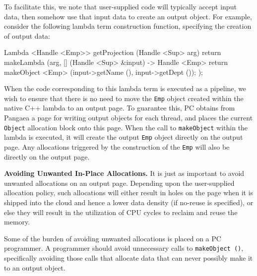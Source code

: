 To facilitate this, we note that user-supplied code will typically accept input data, then somehow use that input data to
create an output object.  For example, consider 
the following lambda term construction function, specifying the creation of output data:

\begin{codesmall}
Lambda <Handle <Emp>> getProjection (Handle <Sup> arg) {
        return makeLambda (arg, [] (Handle <Sup> &input) -> Handle <Emp> {
		return makeObject <Emp> (input->getName (), input->getDept ());
	});}
\end{codesmall}

\noindent
When the code corresponding to this lambda term is executed as a pipeline,
we wish to ensure that there is no need to move the \texttt{Emp} object created within the native C++ lambda to an output page.
To guarantee this,
PC obtains from Pangaea a page for writing output objects for each thread, and places the current \texttt{Object} allocation block
onto this page. 
When the call to \texttt{makeObject} within the lambda is executed, it will create the output \texttt{Emp} object
directly on the output page.  Any allocations triggered by the construction of the \texttt{Emp} will also be directly on the output page.

\vspace{5 pt}
\noindent
\textbf{Avoiding Unwanted In-Place Allocations.}
It is just as important to avoid unwanted allocations on an output page.  Depending upon the user-supplied
allocation policy, such allocations will either result
in holes on the page when it is shipped into the cloud and hence a lower data density (if no-reuse is specified), 
or else they will result in the utilization of CPU cycles to 
reclaim and reuse the memory. 

Some of the burden of avoiding unwanted allocations is placed on a PC programmer. A programmer should
avoid unnecessary calls to \texttt{makeObject ()}, specifically avoiding those calls that allocate data that can never possibly make it to an output object.

